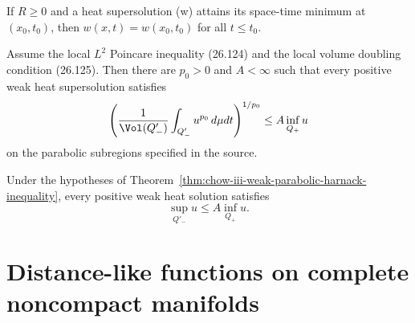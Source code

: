 \begin{corollary}
\label{cor:chow-iii-ricci-flow-strong-maximum-principle}
If \(R\ge0\) and a heat supersolution (w) attains its space-time minimum at
\((x_0,t_0)\), then \(w(x,t)=w(x_0,t_0)\) for all \(t\le t_0\).
\end{corollary}

\begin{theorem}
\label{thm:chow-iii-weak-parabolic-harnack-inequality}
Assume the local \(L^2\) Poincare inequality (26.124) and the local volume
doubling condition (26.125).  Then there are \(p_0>0\) and \(A<\infty\)
such that every positive weak heat supersolution satisfies
\[
 \left(\frac1{\Vol(Q'_-)}\int_{Q'_-}u^{p_0}\,d\mu dt\right)^{1/p_0}
 \le A\inf_{Q_+}u
\]
on the parabolic subregions specified in the source.
\end{theorem}

\begin{theorem}
\label{thm:chow-iii-weak-solution-parabolic-harnack-estimate}
Under the hypotheses of Theorem~\ref{thm:chow-iii-weak-parabolic-harnack-inequality},
every positive weak heat solution satisfies
\[
 \sup_{Q'_-}u\le A\inf_{Q_+}u.
\]
\end{theorem}

\section{Distance-like functions on complete noncompact manifolds}

